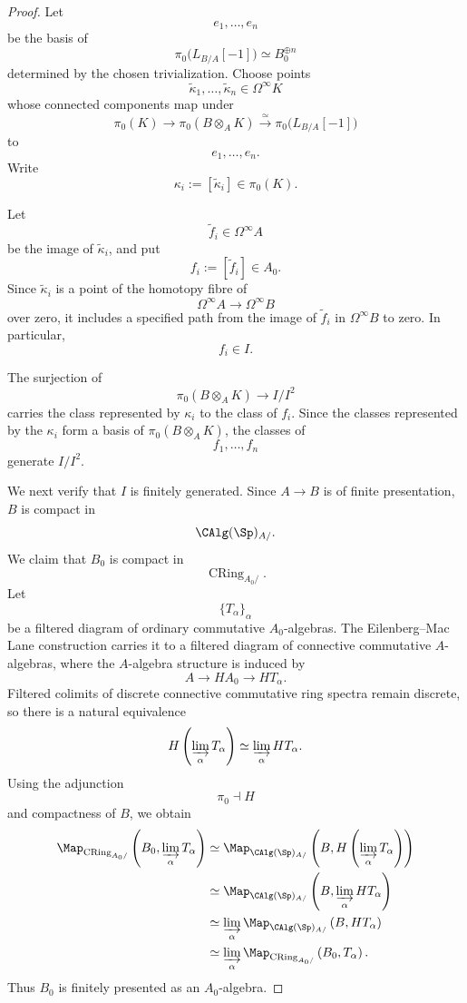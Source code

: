 \begin{proof}
Let
\[
    e_1,\ldots,e_n
\]
be the basis of
\[
    \pi_0
    \bigl(
        L_{B/A}[-1]
    \bigr)
    \simeq
    B_0^{\oplus n}
\]
determined by the chosen trivialization. Choose points
\[
    \widetilde\kappa_1,\ldots,\widetilde\kappa_n
    \in
    \Omega^\infty K
\]
whose connected components map under
\[
    \pi_0(K)
    \longrightarrow
    \pi_0(B\otimes_AK)
    \xrightarrow{\simeq}
    \pi_0
    \bigl(
        L_{B/A}[-1]
    \bigr)
\]
to
\[
    e_1,\ldots,e_n.
\]
Write
\[
    \kappa_i
    :=
    [\widetilde\kappa_i]
    \in
    \pi_0(K).
\]

Let
\[
    \widetilde f_i
    \in
    \Omega^\infty A
\]
be the image of \(\widetilde\kappa_i\), and put
\[
    f_i
    :=
    [\widetilde f_i]
    \in
    A_0.
\]
Since \(\widetilde\kappa_i\) is a point of the homotopy fibre of
\[
    \Omega^\infty A
    \longrightarrow
    \Omega^\infty B
\]
over zero, it includes a specified path from the image of
\(\widetilde f_i\) in \(\Omega^\infty B\) to zero. In particular,
\[
    f_i
    \in
    I.
\]

The surjection of
\[
    \pi_0(B\otimes_AK)
    \longrightarrow
    I/I^2
\]
carries the class represented by \(\kappa_i\) to the class of \(f_i\).
Since the classes represented by the \(\kappa_i\) form a basis of
\(\pi_0(B\otimes_AK)\), the classes of
\[
    f_1,\ldots,f_n
\]
generate \(I/I^2\).

We next verify that \(I\) is finitely generated. Since \(A\to B\) is of
finite presentation, \(B\) is compact in
\[
    \CAlg(\Sp)_{A/}.
\]
We claim that \(B_0\) is compact in
\[
    \operatorname{CRing}_{A_0/}.
\]
Let
\[
    \{T_\alpha\}_\alpha
\]
be a filtered diagram of ordinary commutative \(A_0\)-algebras. The
Eilenberg--Mac Lane construction carries it to a filtered diagram of
connective commutative \(A\)-algebras, where the \(A\)-algebra structure
is induced by
\[
    A
    \longrightarrow
    HA_0
    \longrightarrow
    HT_\alpha.
\]
Filtered colimits of discrete connective commutative ring spectra remain
discrete, so there is a natural equivalence
\[
    H
    \left(
        \varinjlim_\alpha T_\alpha
    \right)
    \simeq
    \varinjlim_\alpha HT_\alpha.
\]
Using the adjunction
\[
    \pi_0
    \dashv
    H
\]
and compactness of \(B\), we obtain
\[
\begin{aligned}
    \Map_{\operatorname{CRing}_{A_0/}}
    \left(
        B_0,
        \varinjlim_\alpha T_\alpha
    \right)
    &\simeq
    \Map_{\CAlg(\Sp)_{A/}}
    \left(
        B,
        H
        \left(
            \varinjlim_\alpha T_\alpha
        \right)
    \right)
    \\
    &\simeq
    \Map_{\CAlg(\Sp)_{A/}}
    \left(
        B,
        \varinjlim_\alpha HT_\alpha
    \right)
    \\
    &\simeq
    \varinjlim_\alpha
    \Map_{\CAlg(\Sp)_{A/}}
    \left(
        B,
        HT_\alpha
    \right)
    \\
    &\simeq
    \varinjlim_\alpha
    \Map_{\operatorname{CRing}_{A_0/}}
    \left(
        B_0,
        T_\alpha
    \right).
\end{aligned}
\]
Thus \(B_0\) is finitely presented as an \(A_0\)-algebra.


\end{proof}
